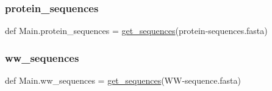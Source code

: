 \mbox{\label{namespace_main_a0f7dfdcfc82e28e54d2d9b4355d51c6a}} 
\subsubsection{\texorpdfstring{protein\+\_\+sequences}{protein\_sequences}}
{\footnotesize\ttfamily def Main.\+protein\+\_\+sequences = \hyperlink{namespace_main_a5e2b1a2a697c8ff97fe0508423af05f2}{get\+\_\+sequences}(\textquotesingle{}protein-\/sequences.\+fasta\textquotesingle{})}

\mbox{\label{namespace_main_ad0e687821118d10a87cd81cdb0597636}} 
\subsubsection{\texorpdfstring{ww\+\_\+sequences}{ww\_sequences}}
{\footnotesize\ttfamily def Main.\+ww\+\_\+sequences = \hyperlink{namespace_main_a5e2b1a2a697c8ff97fe0508423af05f2}{get\+\_\+sequences}(\textquotesingle{}WW-\/sequence.\+fasta\textquotesingle{})}

